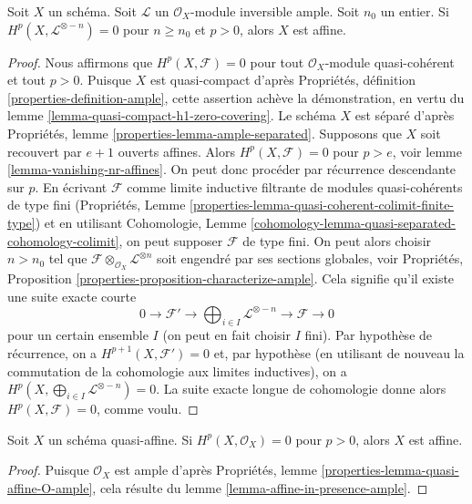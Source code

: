 \begin{lemma}
\label{lemma-affine-in-presence-ample}
Soit $X$ un schéma. Soit $\mathcal{L}$ un
$\mathcal{O}_X$-module inversible ample. Soit $n_0$ un entier.
Si $H^p(X, \mathcal{L}^{\otimes -n}) = 0$ pour $n \geq n_0$ et $p > 0$,
alors $X$ est affine.
\end{lemma}

\begin{proof}
Nous affirmons que $H^p(X, \mathcal{F}) = 0$ pour tout
$\mathcal{O}_X$-module quasi-cohérent et tout $p > 0$. Puisque $X$ est quasi-compact
d'après Propriétés, définition \ref{properties-definition-ample},
cette assertion achève la démonstration, en
vertu du lemme \ref{lemma-quasi-compact-h1-zero-covering}.
Le schéma $X$ est séparé d'après
Propriétés, lemme \ref{properties-lemma-ample-separated}. Supposons
que $X$ soit recouvert par $e + 1$ ouverts affines. Alors
$H^p(X, \mathcal{F}) = 0$ pour $p > e$, voir
lemme \ref{lemma-vanishing-nr-affines}. On peut donc procéder par récurrence
descendante sur $p$. En écrivant $\mathcal{F}$
comme limite inductive filtrante de modules quasi-cohérents de type
fini (Propriétés, Lemme
\ref{properties-lemma-quasi-coherent-colimit-finite-type})
et en utilisant Cohomologie, Lemme
\ref{cohomology-lemma-quasi-separated-cohomology-colimit},
on peut supposer $\mathcal{F}$ de type fini. On
peut alors choisir $n > n_0$ tel que
$\mathcal{F} \otimes_{\mathcal{O}_X} \mathcal{L}^{\otimes n}$
soit engendré par ses sections globales, voir Propriétés, Proposition
\ref{properties-proposition-characterize-ample}.
Cela signifie qu'il existe une suite exacte courte
$$
0 \to \mathcal{F}' \to
\bigoplus\nolimits_{i \in I} \mathcal{L}^{\otimes -n}
\to \mathcal{F} \to 0
$$
pour un certain ensemble $I$ (on peut en fait choisir $I$ fini). Par
hypothèse de récurrence, on a $H^{p + 1}(X, \mathcal{F}') = 0$
et, par hypothèse (en utilisant de nouveau la commutation
de la cohomologie aux limites inductives),
on a $H^p(X, \bigoplus_{i \in I} \mathcal{L}^{\otimes -n}) = 0$.
La suite exacte longue de cohomologie donne alors
$H^p(X, \mathcal{F}) = 0$, comme voulu.
\end{proof}

\begin{lemma}
\label{lemma-affine-if-quasi-affine}
Soit $X$ un schéma quasi-affine.
Si $H^p(X, \mathcal{O}_X) = 0$ pour $p > 0$,
alors $X$ est affine.
\end{lemma}

\begin{proof}
Puisque $\mathcal{O}_X$ est ample d'après
Propriétés, lemme \ref{properties-lemma-quasi-affine-O-ample},
cela résulte du lemme \ref{lemma-affine-in-presence-ample}.
\end{proof}







